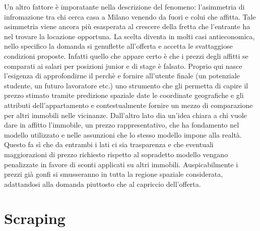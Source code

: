 \documentclass[
  12pt,
  a4paper,
  oneside]{book}
\begin{document}
Un altro fattore è imporatante nella descrizione del fenomeno: l'asimmetria di infromazione tra chi cerca casa a Milano venendo da fuori e colui che affitta. Tale asimmetria viene ancora più esasperata al crescere della fretta che l'entrante ha nel trovare la locazione opportuna. La scelta diventa in molti casi antieconomica, nello specifico la domanda si genuflette all'offerta e accetta le svattaggiose condizioni proposte.
Infatti quello che appare certo è che i prezzi degli affitti se comparati ai salari per posizioni junior e di stage è falsato. Proprio qui nasce l'esigenza di approfondirne il perchè e fornire all'utente finale (un potenziale studente, un futuro lavoratore etc.) uno strumento che gli permetta di capire il prezzo stimato tramite predizione spaziale date le coordinate geografiche e gli attributi dell'appartamento e contestualmente fornire un mezzo di comparazione per altri immobili nelle vicinanze. Dall'altro lato dia un'idea chiara a chi vuole dare in affitto l'immobile, un prezzo rappresentativo, che ha fondamento nel modello utilizzato e nelle assunzioni che lo stesso modello impone alla realtà. Questo fa sì che da entrambi i lati ci sia trasparenza e che eventuali maggiorazioni di prezzo richiesto rispetto al sopradetto modello vengano penalizzate in favore di sconti applicati su altri immobili. Auspicabilmente i prezzi già gonfi si smusseranno in tutta la regione spaziale considerata, adattandosi alla domanda piuttosto che al capriccio dell'offerta.

\hypertarget{scraping}{%
\chapter{Scraping}\label{scraping}}

\citep{lovelace_geocomputation_2019, R-rvest}
\end{document}
